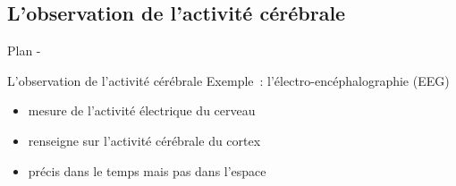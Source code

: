 \documentclass{beamer}
\begin{document}

\subsection{L'observation de l'activité cérébrale}

\begin{frame}{Plan - \secname}
    \tableofcontents[sectionstyle=hide/hide,subsectionstyle=show/shaded/hide]
\end{frame}

\begin{frame}{L'observation de l'activité cérébrale}
    Exemple~: l'électro-encéphalographie (EEG)
    \begin{itemize}
    	\item mesure de l'activité électrique du cerveau
    	\item renseigne sur l'activité cérébrale du cortex
    	\item précis dans le temps mais pas dans l'espace
    \end{itemize}
    ~\\
    \begin{figure}
        \centering
        ~~~
    \end{figure}
\end{frame}
\end{document}
